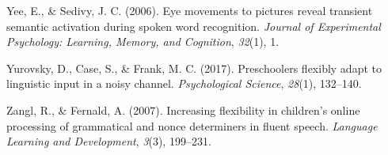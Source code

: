 \documentclass[,man,floatsintext]{apa6}
\begin{document}
\leavevmode\hypertarget{ref-yee2006eye}{}%
Yee, E., \& Sedivy, J. C. (2006). Eye movements to pictures reveal transient semantic activation during spoken word recognition. \emph{Journal of Experimental Psychology: Learning, Memory, and Cognition}, \emph{32}(1), 1.

\leavevmode\hypertarget{ref-yurovsky2017preschoolers}{}%
Yurovsky, D., Case, S., \& Frank, M. C. (2017). Preschoolers flexibly adapt to linguistic input in a noisy channel. \emph{Psychological Science}, \emph{28}(1), 132--140.

\leavevmode\hypertarget{ref-zangl2007increasing}{}%
Zangl, R., \& Fernald, A. (2007). Increasing flexibility in children's online processing of grammatical and nonce determiners in fluent speech. \emph{Language Learning and Development}, \emph{3}(3), 199--231.

\clearpage
\makeatletter
\efloat@restorefloats
\makeatother
\end{document}
